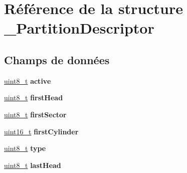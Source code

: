 \hypertarget{struct__PartitionDescriptor}{\section{Référence de la structure \+\_\+\+Partition\+Descriptor}
\label{struct__PartitionDescriptor}
}
\subsection*{Champs de données}
\begin{DoxyCompactItemize}
\item 
\hypertarget{struct__PartitionDescriptor_a7f5b269065ec0ed8f65a1bc00afd712e}{\hyperlink{kernel_2include_2types_8h_aba7bc1797add20fe3efdf37ced1182c5}{uint8\+\_\+t} {\bfseries active}}\label{struct__PartitionDescriptor_a7f5b269065ec0ed8f65a1bc00afd712e}

\item 
\hypertarget{struct__PartitionDescriptor_afb7ff15b362251f2788db0ba5c399f9a}{\hyperlink{kernel_2include_2types_8h_aba7bc1797add20fe3efdf37ced1182c5}{uint8\+\_\+t} {\bfseries first\+Head}}\label{struct__PartitionDescriptor_afb7ff15b362251f2788db0ba5c399f9a}

\item 
\hypertarget{struct__PartitionDescriptor_a0ea29bb1a4577930c23316f4aa76f7fe}{\hyperlink{kernel_2include_2types_8h_aba7bc1797add20fe3efdf37ced1182c5}{uint8\+\_\+t} {\bfseries first\+Sector}}\label{struct__PartitionDescriptor_a0ea29bb1a4577930c23316f4aa76f7fe}

\item 
\hypertarget{struct__PartitionDescriptor_a10bc83fdf064e25cc7aca555f047b70e}{\hyperlink{kernel_2include_2types_8h_adf4d876453337156dde61095e1f20223}{uint16\+\_\+t} {\bfseries first\+Cylinder}}\label{struct__PartitionDescriptor_a10bc83fdf064e25cc7aca555f047b70e}

\item 
\hypertarget{struct__PartitionDescriptor_a2ada512534c41aa57e4bb351d594bfa8}{\hyperlink{kernel_2include_2types_8h_aba7bc1797add20fe3efdf37ced1182c5}{uint8\+\_\+t} {\bfseries type}}\label{struct__PartitionDescriptor_a2ada512534c41aa57e4bb351d594bfa8}

\item 
\hypertarget{struct__PartitionDescriptor_ad88abb3baf9aacb18c2718c186f67d02}{\hyperlink{kernel_2include_2types_8h_aba7bc1797add20fe3efdf37ced1182c5}{uint8\+\_\+t} {\bfseries last\+Head}}\label{struct__PartitionDescriptor_ad88abb3baf9aacb18c2718c186f67d02}


\end{DoxyCompactItemize}
